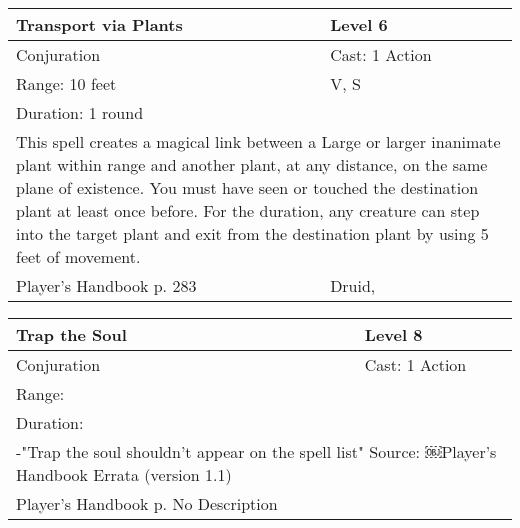 \documentclass[11pt]{report}
\begin{document}
\begin{table}[H]
	\begin{tabular}{||p{6cm}|p{6cm}||}
		\hline\hline
		\bf{Transport via Plants} & Level 6\\ \hline
		Conjuration & Cast: 1 Action\\ \hline
		Range: 10 feet & V, S\\ \hline
		Duration: 1 round & \\ \hline
		\multicolumn{2}{||p{12cm}||}{This spell creates a magical link between a Large or larger inanimate plant within range and another plant, at any distance, on the same plane of existence. You must have seen or touched the destination plant at least once before. For the duration, any creature can step into the target plant and exit from the destination plant by using 5 feet of movement.}\\ \hline
Player's Handbook p. 283 & Druid, \\ \hline\hline
	\end{tabular}
\end{table}

\begin{table}[H]
	\begin{tabular}{||p{6cm}|p{6cm}||}
		\hline\hline
		\bf{Trap the Soul} & Level 8\\ \hline
		Conjuration & Cast: 1 Action\\ \hline
		Range:  & \\ \hline
		Duration:  & \\ \hline
		\multicolumn{2}{||p{12cm}||}{-"Trap the soul shouldn’t appear on the spell list"
Source: ￼Player’s Handbook Errata (version 1.1)}\\ \hline
Player's Handbook p. No Description & \\ \hline\hline
	\end{tabular}
\end{table}
\end{document}

